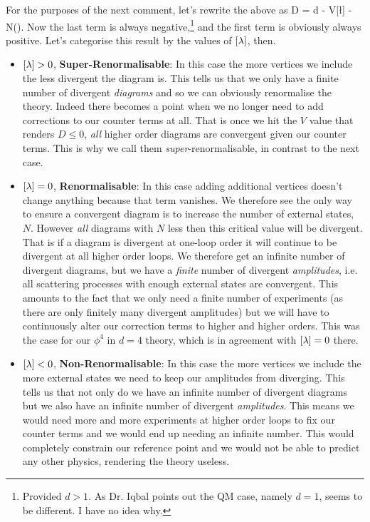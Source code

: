 For the purposes of the next comment, let's rewrite the above as 
\bse 
    D = d - V[\l] - N\bigg(\bigg).
\ese 
Now the last term is always negative,\footnote{Provided $d>1$. As Dr. Iqbal points out the QM case, namely $d=1$, seems to be different. I have no idea why.} and the first term is obviously always positive. Let's categorise this result by the values of $[\lambda]$, then. 
\begin{itemize}
    \item $[\lambda]>0$, \textbf{Super-Renormalisable}: In this case the more vertices we include the less divergent the diagram is. This tells us that we only have a finite number of divergent \textit{diagrams} and so we can obviously renormalise the theory. Indeed there becomes a point when we no longer need to add corrections to our counter terms at all. That is once we hit the $V$ value that renders $D\leq 0$, \textit{all} higher order diagrams are convergent given our counter terms. This is why we call them \textit{super}-renormalisable, in contrast to the next case. 
    \item $[\lambda]=0$, \textbf{Renormalisable}: In this case adding additional vertices doesn't change anything because that term vanishes. We therefore see the only way to ensure a convergent diagram is to increase the number of external states, $N$. However \textit{all} diagrams with $N$ less then this critical value will be divergent. That is if a diagram is divergent at one-loop order it will continue to be divergent at all higher order loops. We therefore get an infinite number of divergent diagrams, but we have a \textit{finite} number of divergent \textit{amplitudes}, i.e. all scattering processes with enough external states are convergent. This amounts to the fact that we only need a finite number of experiments (as there are only finitely many divergent amplitudes) but we will have to continuously alter our correction terms to higher and higher orders. This was the case for our $\phi^4$ in $d=4$ theory, which is in agreement with $[\lambda]=0$ there.
    \item $[\lambda]<0$, \textbf{Non-Renormalisable}: In this case the more vertices we include the more external states we need to keep our amplitudes from diverging. This tells us that not only do we have an infinite number of divergent diagrams but we also have an infinite number of divergent \textit{amplitudes}. This means we would need more and more experiments at higher order loops to fix our counter terms and we would end up needing an infinite number. This would completely constrain our reference point and we would not be able to predict any other physics, rendering the theory useless.
\end{itemize}

